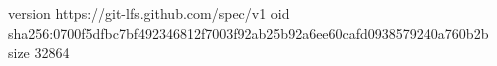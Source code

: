 version https://git-lfs.github.com/spec/v1
oid sha256:0700f5dfbc7bf492346812f7003f92ab25b92a6ee60cafd0938579240a760b2b
size 32864
